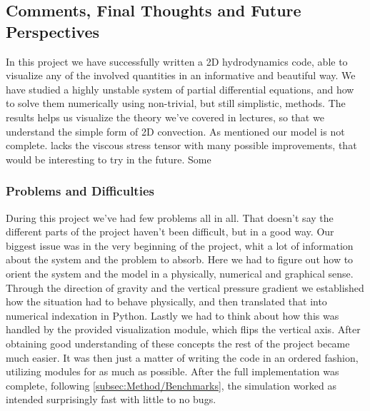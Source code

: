 \documentclass[11pt,a4paper,twocolumn,titlepage]{article}
\begin{document}
\subsection{Comments, Final Thoughts and Future Perspectives}\label{subsec:Conclusion/Comments}
In this project we have successfully written a 2D hydrodynamics code, able to visualize any of the involved quantities in an informative and beautiful way. We have studied a highly unstable system of partial differential equations, and how to solve them numerically using non-trivial, but still simplistic, methods. The results helps us visualize the theory we've covered in lectures, so that we understand the simple form of 2D convection. As mentioned our model is not complete. lacks the viscous stress tensor  with many possible improvements, that would be interesting to try in the future. Some 

\subsubsection{Problems and Difficulties}
During this project we've had few problems all in all. That doesn't say the different parts of the project haven't been difficult, but in a good way. Our biggest issue was in the very beginning of the project, whit a lot of information about the system and the problem to absorb. Here we had to figure out how to orient the system and the model in a physically, numerical and graphical sense. Through the direction of gravity and the vertical pressure gradient we established how the situation had to behave physically, and then translated that into numerical indexation in Python. Lastly we had to think about how this was handled by the provided visualization module, which flips the vertical axis. After obtaining good understanding of these concepts the rest of the project became much easier. It was then just a matter of writing the code in an ordered fashion, utilizing modules for as much as possible. After the full implementation was complete, following \cref{subsec:Method/Benchmarks}, the simulation worked as intended surprisingly fast with little to no bugs.

%
%
%
%
%
%
%
%
%
\end{document}
